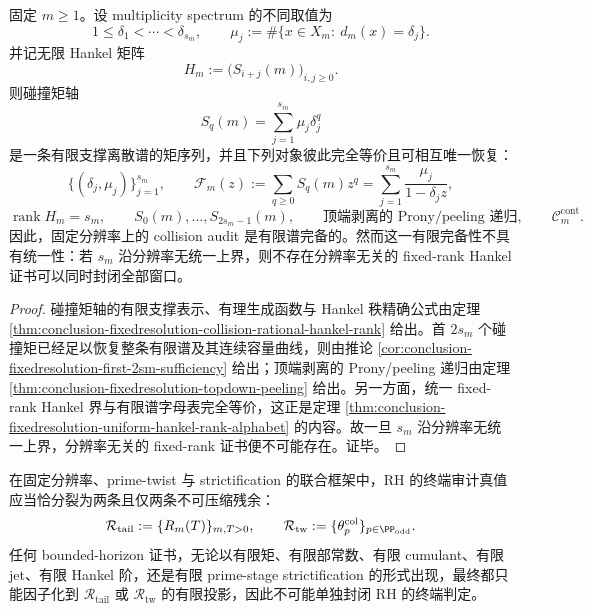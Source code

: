 \begin{theorem}[固定分辨率碰撞矩轴的有限谱闭包与非统一有限决定性]\label{thm:conclusion-fixedresolution-collision-axis-finitespectrum-closure}
固定 \(m\ge 1\)。设 multiplicity spectrum 的不同取值为
\[
1\le \delta_1<\cdots<\delta_{s_m},
\qquad
\mu_j:=\#\{x\in X_m:\ d_m(x)=\delta_j\}.
\]
并记无限 Hankel 矩阵
\[
H_m:=\bigl(S_{i+j}(m)\bigr)_{i,j\ge 0}.
\]
则碰撞矩轴
\[
S_q(m)=\sum_{j=1}^{s_m}\mu_j\delta_j^q
\]
是一条有限支撑离散谱的矩序列，并且下列对象彼此完全等价且可相互唯一恢复：
\[
\{(\delta_j,\mu_j)\}_{j=1}^{s_m},
\qquad
\mathcal F_m(z):=\sum_{q\ge 0}S_q(m)z^q
=
\sum_{j=1}^{s_m}\frac{\mu_j}{1-\delta_j z},
\]
\[
\operatorname{rank}H_m=s_m,
\qquad
S_0(m),\dots,S_{2s_m-1}(m),
\qquad
\text{顶端剥离的 Prony/peeling 递归},
\qquad
\mathcal C_m^{\mathrm{cont}}.
\]
因此，固定分辨率上的 collision audit 是有限谱完备的。然而这一有限完备性不具有统一性：若 \(s_m\) 沿分辨率无统一上界，则不存在分辨率无关的 fixed-rank Hankel 证书可以同时封闭全部窗口。
\end{theorem}
\begin{proof}
碰撞矩轴的有限支撑表示、有理生成函数与 Hankel 秩精确公式由定理 \ref{thm:conclusion-fixedresolution-collision-rational-hankel-rank} 给出。首 \(2s_m\) 个碰撞矩已经足以恢复整条有限谱及其连续容量曲线，则由推论 \ref{cor:conclusion-fixedresolution-first-2sm-sufficiency} 给出；顶端剥离的 Prony/peeling 递归由定理 \ref{thm:conclusion-fixedresolution-topdown-peeling} 给出。另一方面，统一 fixed-rank Hankel 界与有限谱字母表完全等价，这正是定理 \ref{thm:conclusion-fixedresolution-uniform-hankel-rank-alphabet} 的内容。故一旦 \(s_m\) 沿分辨率无统一上界，分辨率无关的 fixed-rank 证书便不可能存在。证毕。
\end{proof}

\begin{conjecture}\label{conj:conclusion-rh-terminal-audit-two-incompressible-kernels}
在固定分辨率、prime-twist 与 strictification 的联合框架中，RH 的终端审计真值应当恰分裂为两条且仅两条不可压缩残余：
\[
\mathcal R_{\mathrm{tail}}
:=
\{R_m(T)\}_{m,T>0},
\qquad
\mathcal R_{\mathrm{tw}}
:=
\{\theta_p^{\mathrm{col}}\}_{p\in\PP_{\mathrm{odd}}}.
\]
任何 bounded-horizon 证书，无论以有限矩、有限部常数、有限 cumulant、有限 jet、有限 Hankel 阶，还是有限 prime-stage strictification 的形式出现，最终都只能因子化到 \(\mathcal R_{\mathrm{tail}}\) 或 \(\mathcal R_{\mathrm{tw}}\) 的有限投影，因此不可能单独封闭 RH 的终端判定。
\end{conjecture}

